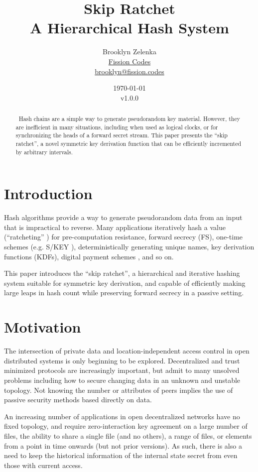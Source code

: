 \documentclass{article}
\title{Skip Ratchet \\[1ex] \large A Hierarchical Hash System}
\author{Brooklyn Zelenka \\ \href{https://fission.codes}{Fission Codes} \\ \href{mailto:brooklyn@fission.codes}{brooklyn@fission.codes} }
\date{\today\\v1.0.0}
\begin{document}
    \maketitle
    
   	\begin{abstract}\
   		Hash chains are a simple way to generate pseudorandom key material. However, they are inefficient in many situations, including when used as logical clocks, or for synchronizing the heads of a forward secret stream. This paper presents the ``skip ratchet'', a novel symmetric key derivation function that can be efficiently incremented by arbitrary intervals.
   	\end{abstract}

   	\section{Introduction}
   	
	Hash algorithms provide a way to generate pseudorandom data from an input that is impractical to reverse. Many applications iteratively hash a value (``ratcheting'' \cite{pond}) for pre-computation resistance, forward secrecy (FS), one-time schemes (e.g. S/KEY \cite{rfc1760}), deterministically generating unique names, key derivation functions (KDFs), digital payment schemes \cite{multidimensional}, and so on.
	
	This paper introduces the ``skip ratchet'', a hierarchical and iterative hashing system suitable for symmetric key derivation, and capable of efficiently making large leaps in hash count while preserving forward secrecy in a passive setting.

    \section{Motivation}
    
    The intersection of private data and location-independent access control in open distributed systems is only beginning to be explored. Decentralized and trust minimized protocols are increasingly important, but admit to many unsolved problems including how to secure changing data in an unknown and unstable topology. Not knowing the number or attributes of peers implies the use of passive security methods based directly on data.
    
    An increasing number of applications in open decentralized networks have no fixed topology, and require zero-interaction key agreement on a large number of files, the ability to share a single file (and no others), a range of files, or elements from a point in time onwards (but not prior versions). As such, there is also a need to keep the historical information of the internal state secret from even those with current access.
    
\end{document}
